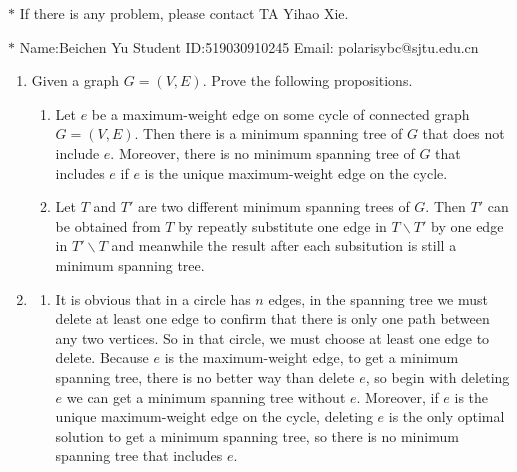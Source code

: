 \documentclass[12pt,a4paper]{article}
\makeatletter
\newtheorem*{solution}{Solution}
\theoremstyle{definition}
\renewenvironment{solution}[1][Solution] {\par\pushQED{\qed}\normalfont\topsep6\p@\@plus6\p@\relax\trivlist\item[\hskip\labelsep\bfseries#1\@addpunct{.}]\ignorespaces}{\popQED\endtrivlist\@endpefalse} \makeatother
\makeatother
\begin{document}
\noindent

\noindent{}
\begin{center}
\footnotesize{\color{red}$*$ If there is any problem, please contact TA Yihao Xie. }

\footnotesize{\color{blue}$*$ Name:Beichen Yu  \quad Student ID:519030910245 \quad Email: polarisybc@sjtu.edu.cn}
\end{center}

\begin{enumerate}

	\item Given a graph $G = (V, E)$. Prove the following propositions.
	
	\begin{enumerate}
		\item Let $e$ be a maximum-weight edge on some cycle of connected graph $G=(V,E)$.
        Then there is a minimum spanning tree of $G$ that does not include $e$. Moreover, there is no minimum spanning tree of $G$ that includes $e$ if $e$ is the unique maximum-weight edge on the cycle. 
		\item Let $T$ and $T'$ are two different minimum spanning trees of $G$. Then $T'$ can be obtained from $T$ by repeatly substitute one edge in $T\backslash T'$ by one edge in $T'\backslash T$ and meanwhile the result after each subsitution is still a minimum spanning tree.
	\end{enumerate}
	
	\begin{solution}
	\begin{enumerate}
	\item It is obvious that in a circle has $n$ edges, in the spanning tree we must delete at least one edge to confirm that there is only one path between any two vertices. So in that circle, we must choose at least one edge to delete. Because $e$ is the maximum-weight edge, to get a minimum spanning tree, there is no better way than delete $e$, so begin with deleting $e$ we can get a minimum spanning tree without $e$. Moreover, if $e$ is the unique maximum-weight edge on the cycle, deleting $e$ is the only optimal solution to get a minimum spanning tree, so there is no minimum spanning tree that includes $e$.
	

\end{enumerate}
\end{solution}
\end{enumerate}
\end{document}
